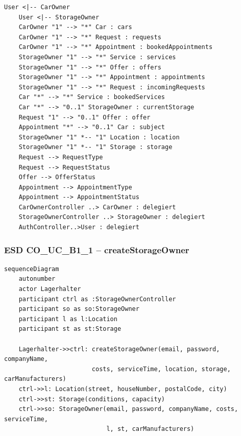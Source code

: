 \begin{lstlisting}[basicstyle=\ttfamily\small, breaklines=true]
    User <|-- CarOwner
    User <|-- StorageOwner
    CarOwner "1" --> "*" Car : cars
    CarOwner "1" --> "*" Request : requests
    CarOwner "1" --> "*" Appointment : bookedAppointments
    StorageOwner "1" --> "*" Service : services
    StorageOwner "1" --> "*" Offer : offers
    StorageOwner "1" --> "*" Appointment : appointments
    StorageOwner "1" --> "*" Request : incomingRequests
    Car "*" --> "*" Service : bookedServices
    Car "*" --> "0..1" StorageOwner : currentStorage
    Request "1" --> "0..1" Offer : offer
    Appointment "*" --> "0..1" Car : subject
    StorageOwner "1" *-- "1" Location : location
    StorageOwner "1" *-- "1" Storage : storage
    Request --> RequestType
    Request --> RequestStatus
    Offer --> OfferStatus
    Appointment --> AppointmentType
    Appointment --> AppointmentStatus
    CarOwnerController ..> CarOwner : delegiert
    StorageOwnerController ..> StorageOwner : delegiert
    AuthController..>User : delegiert
\end{lstlisting}

\newpage



{}
\subsubsection*{ESD CO\_UC\_B1\_1 – createStorageOwner}

\begin{lstlisting}[basicstyle=\ttfamily\small, breaklines=true]
sequenceDiagram
    autonumber
    actor Lagerhalter
    participant ctrl as :StorageOwnerController
    participant so as so:StorageOwner
    participant l as l:Location
    participant st as st:Storage

    Lagerhalter->>ctrl: createStorageOwner(email, password, companyName,
                        costs, serviceTime, location, storage, carManufacturers)
    ctrl->>l: Location(street, houseNumber, postalCode, city)
    ctrl->>st: Storage(conditions, capacity)
    ctrl->>so: StorageOwner(email, password, companyName, costs, serviceTime,
                            l, st, carManufacturers)
\end{lstlisting}

